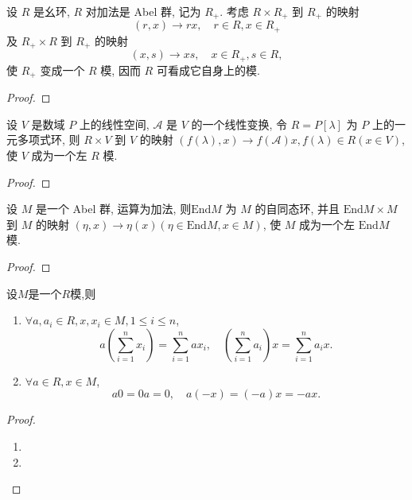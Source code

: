 \documentclass[../../main.tex]{subfiles}
\begin{document}
\begin{example}
设 \( R \) 是幺环, \( R \) 对加法是 Abel 群, 记为 \( R_+ \). 考虑 \( R \times R_+ \) 到 \( R_+ \) 的映射
\[
(r,x) \to rx, \quad r \in R, x \in R_+
\]
及 \( R_+ \times R \) 到 \( R_+ \) 的映射
\[
(x,s) \to xs, \quad x \in R_+, s \in R,
\]
使 \( R_+ \) 变成一个 \( R \) 模, 因而 \( R \) 可看成它自身上的模.
\end{example}
\begin{proof}


\end{proof}

\begin{example}\label{example:抽象代数-例题1.6.4}
设 \( V \) 是数域 \( P \) 上的线性空间, \( \mathcal{A} \) 是 \( V \) 的一个线性变换, 令 \( R = P[\lambda] \) 为 \( P \) 上的一元多项式环, 则 \( R \times V \) 到 \( V \) 的映射 \( (f(\lambda),x) \to f(\mathcal{A})x, f(\lambda) \in R (x \in V) \), 使 \( V \) 成为一个左 \( R \) 模.
\end{example}
\begin{proof}


\end{proof}

\begin{example}
设 \( M \) 是一个 Abel 群, 运算为加法, 则\( \text{End}M \) 为 \( M \) 的自同态环, 并且 \( \text{End}M \times M \) 到 \( M \) 的映射 \( (\eta,x) \to \eta(x) (\eta \in \text{End}M, x \in M) \), 使 \( M \) 成为一个左 \( \text{End}M \) 模.
\end{example}
\begin{proof}


\end{proof}

\begin{theorem}
设$M$是一个$R$模,则
\begin{enumerate}[(1)]
\item  \( \forall a,a_i \in R, x,x_i \in M, 1 \leqslant i \leqslant n \),
\[
a\left( \sum_{i=1}^n x_i \right) = \sum_{i=1}^n ax_i, \quad \left( \sum_{i=1}^n a_i \right) x = \sum_{i=1}^n a_i x.
\]

\item \( \forall a \in R, x \in M \),
\[
a0 = 0a = 0, \quad a(-x) = (-a)x = -ax.
\]
\end{enumerate}
\end{theorem}
\begin{proof}
\begin{enumerate}[(1)]
\item 

\item 
\end{enumerate}

\end{proof}
\end{document}
